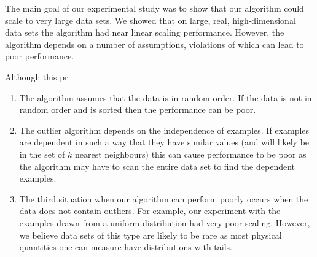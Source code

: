 The main goal of our experimental study was to show that our algorithm could
scale to very large data sets. We showed that on large, real, high-dimensional
data sets the algorithm had near linear scaling performance. However, the
algorithm depends on a number of assumptions, violations of which can lead to
poor performance.

Although this pr

\begin{enumerate}
    \item The algorithm assumes that the data is in random order. If the data is
        not in random order and is sorted then the performance can be poor.
    \item The outlier algorithm depends on the independence of examples. If
        examples are dependent in such a way that they have similar values (and
        will likely be in the set of $k$ nearest neighbours) this can cause
        performance to be poor as the algorithm may have to scan the entire data
        set to find the dependent examples.
    \item The third situation when our algorithm can perform poorly occurs when
        the data does not contain outliers. For example, our experiment with the
        examples drawn from a uniform distribution had very poor scaling.
        However, we believe data sets of this type are likely to be rare as most
        physical quantities one can measure have distributions with tails.
\end{enumerate}